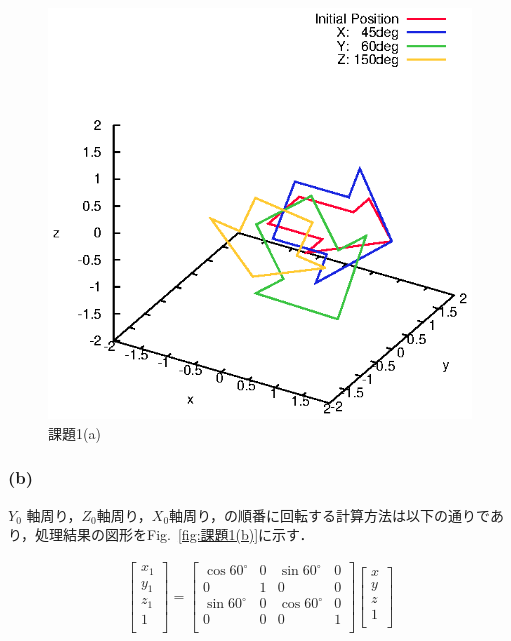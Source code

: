 \documentclass[a4paper,10pt]{jsarticle}
\begin{document}
\begin{figure}[tb]
  \begin{center}
    \includegraphics[clip,width=14cm]{fig/eps/1(a).eps}
  \end{center}
  \caption{課題1(a)}
  \label{fig:課題1(a)}
\end{figure}

\subsubsection{(b)}
$Y_0$ 軸周り，$Z_0$軸周り，$X_0$軸周り，の順番に回転する計算方法は以下の通りであり，処理結果の図形をFig.~\ref{fig:課題1(b)}に示す．

\begin{eqnarray}
\label{eq:d}
  \left[
    \begin{array}{c}
      x_1\\
      y_1\\
      z_1\\
      1\\
    \end{array}
  \right] =
  \left[
    \begin{array}{cccc}
      \cos{60^\circ} & 0 & \sin{60^\circ} & 0 \\
      0 & 1 & 0 & 0\\
      \sin{60^\circ} & 0 & \cos{60^\circ} & 0\\
      0 & 0 & 0 & 1\\
    \end{array}
  \right]\left[
    \begin{array}{c}
      x\\
      y\\
      z\\
      1\\
    \end{array}
  \right]
\end{eqnarray}
\end{document}
